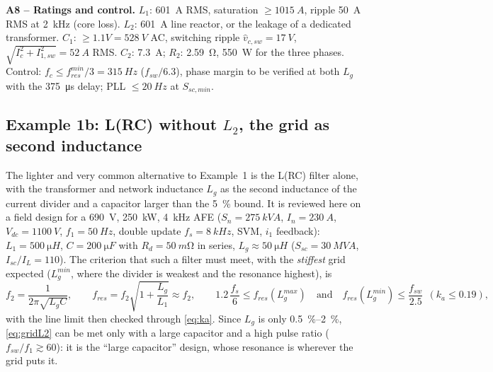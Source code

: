 \documentclass[10pt,a4paper]{scrartcl}
\newcommand{\Vdc}{V_{dc}}
\newcommand{\fsw}{f_{sw}}
\newcommand{\fres}{f_{res}}
\newcommand{\Lg}{L_{g}}
\begin{document}
\begin{onehalfspace}
\textbf{A8 -- Ratings and control.} $L_1$: \SI{601}{A} RMS, saturation $\ge \SI{1015}{A}$, ripple \SI{50}{A} RMS at \SI{2}{kHz} (core loss). $L_2$: \SI{601}{A} line reactor, or the leakage of a dedicated transformer. $C_1$: $\ge 1.1V = \SI{528}{V}$ AC, switching ripple $\hat v_{c,sw} = \SI{17}{V}$, $\sqrt{I_c^2 + I_{1,sw}^2} = \SI{52}{A}$ RMS. $C_2$: \SI{7.3}{A}; $R_2$: \SI{2.59}{\ohm}, \SI{550}{W} for the three phases. Control: $f_c \le \fres^{min}/3 = \SI{315}{Hz}$ ($\fsw/6.3$), phase margin to be verified at both $\Lg$ with the \SI{375}{\micro s} delay; PLL $\le \SI{20}{Hz}$ at $S_{sc,min}$.

\subsection{Example 1b: L(RC) without $L_2$, the grid as second inductance}
\label{sec:gridL2}
The lighter and very common alternative to Example~1 is the L(RC) filter alone, with the transformer and network inductance $\Lg$ as the second inductance of the current divider and a capacitor larger than the \SI{5}{\percent} bound. It is reviewed here on a field design for a \SI{690}{V}, \SI{250}{kW}, \SI{4}{kHz} AFE ($S_n = \SI{275}{kVA}$, $I_n = \SI{230}{A}$, $\Vdc = \SI{1100}{V}$, $f_1 = \SI{50}{Hz}$, double update $f_s = \SI{8}{kHz}$, SVM, $i_1$ feedback): $L_1 = \SI{500}{\micro H}$, $C = \SI{200}{\micro F}$ with $R_d = \SI{50}{m\ohm}$ in series, $\Lg \approx \SI{50}{\micro H}$ ($S_{sc} = \SI{30}{MVA}$, $I_{sc}/I_L = 110$). The criterion that such a filter must meet, with the \emph{stiffest} grid expected ($\Lg^{min}$, where the divider is weakest and the resonance highest), is
\begin{equation}
f_2 = \frac{1}{2\pi\sqrt{\Lg C}},\qquad \fres = f_2\sqrt{1 + \frac{\Lg}{L_1}} \approx f_2,\qquad
1.2\,\frac{f_s}{6} \le \fres(\Lg^{max}) \quad\text{and}\quad \fres(\Lg^{min}) \le \frac{\fsw}{2.5}\ \ (k_a \le 0.19),
\label{eq:gridL2}
\end{equation}
with the line limit then checked through \eqref{eq:ka}. Since $\Lg$ is only \SIrange{0.5}{2}{\percent}, \eqref{eq:gridL2} can be met only with a large capacitor and a high pulse ratio ($\fsw/f_1 \gtrsim 60$): it is the ``large capacitor'' design, whose resonance is wherever the grid puts it.


\end{onehalfspace}
\end{document}
